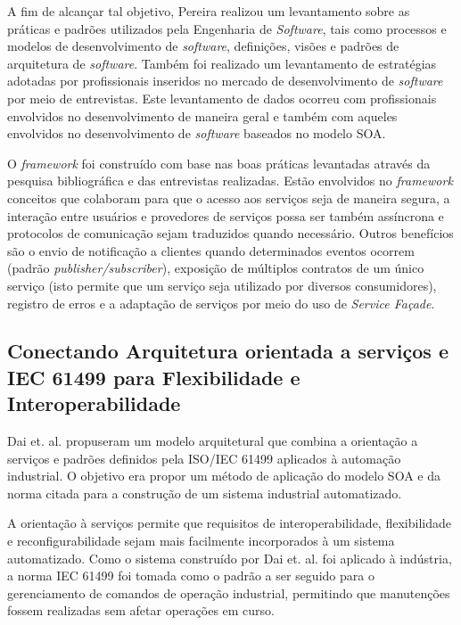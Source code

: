 A fim de alcançar tal objetivo, Pereira realizou um levantamento sobre as práticas e padrões utilizados pela Engenharia de \textit{Software}, tais como processos e modelos de desenvolvimento de \textit{software}, definições, visões e padrões de arquitetura de \textit{software}. Também foi realizado um levantamento de estratégias adotadas por profissionais inseridos no mercado de desenvolvimento de \textit{software} por meio de entrevistas. Este levantamento de dados ocorreu com profissionais envolvidos no desenvolvimento de maneira geral e também com aqueles envolvidos no desenvolvimento de \textit{software} baseados no modelo SOA.

O \textit{framework} foi construído com base nas boas práticas levantadas através da pesquisa bibliográfica e das entrevistas realizadas. Estão envolvidos no \textit{framework} conceitos que colaboram para que o acesso aos serviços seja de maneira segura, a interação entre usuários e provedores de serviços possa ser também assíncrona e protocolos de comunicação sejam traduzidos quando necessário. Outros benefícios são o envio de notificação a clientes quando determinados eventos ocorrem (padrão \textit{publisher/subscriber}), exposição de múltiplos contratos de um único serviço (isto permite que um serviço seja utilizado por diversos consumidores), registro de erros e a adaptação de serviços por meio do uso de \textit{Service Façade}.

\subsection{Conectando Arquitetura orientada a serviços e IEC 61499 para Flexibilidade e Interoperabilidade}

Dai et. al. \cite{dai_bridging_2015} propuseram um modelo arquitetural que combina a orientação a serviços e padrões definidos pela ISO/IEC 61499 aplicados à automação industrial. O objetivo era propor um método de aplicação do modelo SOA e da norma citada para a construção de um sistema industrial automatizado.

A orientação à serviços permite que requisitos de interoperabilidade, flexibilidade e reconfigurabilidade sejam mais facilmente incorporados à um sistema automatizado. Como o sistema construído por Dai et. al. \cite{dai_bridging_2015} foi aplicado à indústria, a norma IEC 61499 foi tomada como o padrão a ser seguido para o gerenciamento de comandos de operação industrial, permitindo que manutenções fossem realizadas sem afetar operações em curso.

